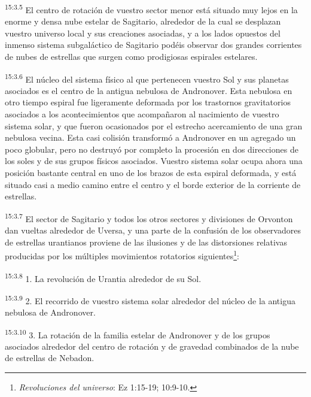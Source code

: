 \par
\textsuperscript{15:3.5} El centro de rotación de vuestro sector menor está situado muy lejos en la enorme y densa nube estelar de Sagitario, alrededor de la cual se desplazan vuestro universo local y sus creaciones asociadas, y a los lados opuestos del inmenso sistema subgaláctico de Sagitario podéis observar dos grandes corrientes de nubes de estrellas que surgen como prodigiosas espirales estelares.

\par
\textsuperscript{15:3.6} El núcleo del sistema físico al que pertenecen vuestro Sol y sus planetas asociados es el centro de la antigua nebulosa de Andronover. Esta nebulosa en otro tiempo espiral fue ligeramente deformada por los trastornos gravitatorios asociados a los acontecimientos que acompañaron al nacimiento de vuestro sistema solar, y que fueron ocasionados por el estrecho acercamiento de una gran nebulosa vecina. Esta casi colisión transformó a Andronover en un agregado un poco globular, pero no destruyó por completo la procesión en dos direcciones de los soles y de sus grupos físicos asociados. Vuestro sistema solar ocupa ahora una posición bastante central en uno de los brazos de esta espiral deformada, y está situado casi a medio camino entre el centro y el borde exterior de la corriente de estrellas.

\par
\textsuperscript{15:3.7} El sector de Sagitario y todos los otros sectores y divisiones de Orvonton dan vueltas alrededor de Uversa, y una parte de la confusión de los observadores de estrellas urantianos proviene de las ilusiones y de las distorsiones relativas producidas por los múltiples movimientos rotatorios siguientes\footnote{\textit{Revoluciones del universo}: Ez 1:15-19; 10:9-10.}:

\par
\textsuperscript{15:3.8} 1. La revolución de Urantia alrededor de su Sol.

\par
\textsuperscript{15:3.9} 2. El recorrido de vuestro sistema solar alrededor del núcleo de la antigua nebulosa de Andronover.

\par
\textsuperscript{15:3.10} 3. La rotación de la familia estelar de Andronover y de los grupos asociados alrededor del centro de rotación y de gravedad combinados de la nube de estrellas de Nebadon.

